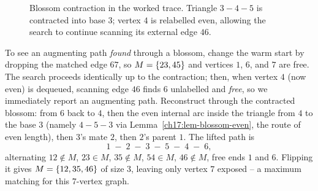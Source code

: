 \begin{figure}[H]
\centering
{}
\caption{Blossom contraction in the worked trace. Triangle $3-4-5$ is contracted into base $3$; vertex $4$ is relabelled even, allowing the search to continue scanning its external edge $46$.}
\label{ch17:fig-blossom-contract-detect}
\end{figure}

To see an augmenting path \emph{found} through a blossom, change the warm start by dropping the matched edge
$67$, so $M=\{23,45\}$ and vertices $1$, $6$, and $7$ are free. The search proceeds identically up to the
contraction; then, when vertex $4$ (now even) is dequeued, scanning edge $46$ finds $6$ unlabelled and
\emph{free}, so we immediately report an augmenting path. Reconstruct
through the contracted blossom: from $6$ back to $4$, then the even internal arc inside the triangle
from $4$ to the base $3$ (namely $4\!-\!5\!-\!3$ via Lemma~\ref{ch17:lem-blossom-even}, the route of
even length), then $3$'s mate $2$, then $2$'s parent $1$. The lifted path is
\[
1 \;-\; 2 \;-\; 3 \;-\; 5 \;-\; 4 \;-\; 6,
\]
alternating $12\notin M$, $23\in M$, $35\notin M$, $54\in M$, $46\notin M$, free ends $1$ and $6$.
Flipping it gives $M=\{12,35,46\}$ of size $3$, leaving only vertex $7$ exposed -- a maximum
matching for this $7$-vertex graph.

